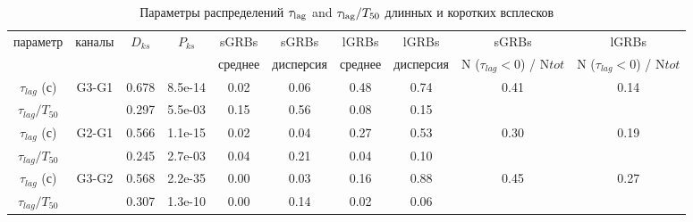 \begin{table} [h]
 \centering
 \caption{Параметры распределений $\tau_{{\mathrm{lag}}}$ and $\tau_{{\mathrm{lag}}}/T_{50}$ 
 длинных и коротких всплесков}\label{tab:lag_distr}
\scriptsize
  \begin{center}
  \begin{tabular}{c c c c c c c c c c}
  \hline
  \hline
параметр & каналы & $D_{ks}$ &  $P_{ks}$ 
& sGRBs & sGRBs & lGRBs & lGRBs & sGRBs & lGRBs \\
         &        &          &           
& среднее &  дисперсия   &  среднее &  дисперсия  & N ($\tau_{lag}<0$) / N${tot}$ & N ($\tau_{lag}<0$) / N${tot}$\\
\hline
$\tau_{lag}$ (с)    & G3-G1 &	0.678 &	8.5e-14 &	0.02 &	0.06 &	0.48 &	0.74 &	0.41 & 0.14\\
$\tau_{lag}/T_{50}$ &	    &   0.297 & 5.5e-03	&   0.15 &	0.56 &	0.08 & 	0.15 &		 &     \\
$\tau_{lag}$ (с)    & G2-G1 &   0.566 &	1.1e-15	&   0.02 &	0.04 &	0.27 &	0.53 &	0.30 & 0.19 \\
$\tau_{lag}/T_{50}$ & 	    &   0.245 &	2.7e-03	&   0.04 &	0.21 &	0.04 &	0.10 &	 &	\\	
$\tau_{lag}$ (с)    & G3-G2 &	0.568 & 2.2e-35	&   0.00 &	0.03 &	0.16 &	0.88 &	0.45 &	0.27 \\
$\tau_{lag}/T_{50}$ &       &	0.307 & 1.3e-10	&   0.00 &	0.14 &	0.02 &	0.06 &		 &	\\
\hline
\end{tabular}
\end{center}
\end{table}